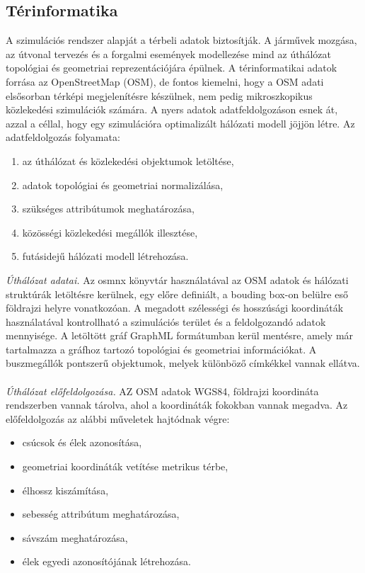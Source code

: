 \documentclass[14pt,a4paper]{extarticle}
\begin{document}
\subsection{Térinformatika}
A szimulációs rendszer alapját a térbeli adatok biztosítják. A járművek mozgása, az útvonal tervezés és a forgalmi események modellezése mind az úthálózat topológiai és geometriai reprezentációjára épülnek. A térinformatikai adatok forrása az OpenStreetMap (OSM), de fontos kiemelni, hogy a OSM adati elsősorban térképi megjelenítésre készülnek, nem pedig mikroszkopikus közlekedési szimulációk számára. A nyers adatok adatfeldolgozáson esnek át, azzal a céllal, hogy egy szimulációra optimalizált hálózati modell jöjjön létre.
Az adatfeldolgozás folyamata:
\begin{enumerate}
    \item az úthálózat és közlekedési objektumok letöltése,
    \item adatok topológiai és geometriai normalizálása,
    \item szükséges attribútumok meghatározása,
    \item közösségi közlekedési megállók illesztése,
    \item futásidejű hálózati modell létrehozása.
\end{enumerate}
\textit{Úthálózat adatai.} Az osmnx könyvtár használatával az OSM adatok és hálózati struktúrák letöltésre kerülnek, egy előre definiált, a bouding box-on belülre eső földrajzi helyre vonatkozóan. A megadott szélességi és hosszúsági koordináták használatával kontrollható a szimulációs terület és a feldolgozandó adatok mennyisége. A letöltött gráf GraphML formátumban kerül mentésre, amely már tartalmazza a gráfhoz tartozó topológiai és geometriai információkat. A buszmegállók pontszerű objektumok, melyek különböző címkékkel vannak ellátva.
\\
\\
\textit{Úthálózat előfeldolgozása.} AZ OSM adatok WGS84, földrajzi koordináta rendszerben vannak tárolva, ahol a koordináták fokokban vannak megadva. Az előfeldolgozás az alábbi műveletek hajtódnak végre:
\begin{itemize}
    \item csúcsok és élek azonosítása,
    \item geometriai koordináták vetítése metrikus térbe,
    \item élhossz kiszámítása,
    \item sebesség attribútum meghatározása,
    \item sávszám meghatározása,
    \item élek egyedi azonosítójának létrehozása.
\end{itemize}
\end{document}
